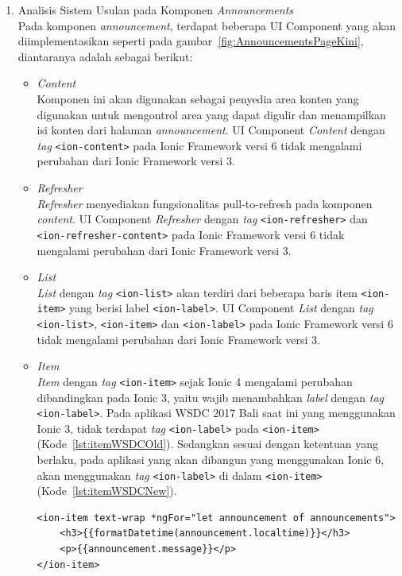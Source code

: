 \begin{enumerate}
\begin{enumerate}
		\item Analisis Sistem Usulan pada Komponen \textit{Announcements} \\
		Pada komponen \textit{announcement}, terdapat beberapa UI Component yang akan diimplementasikan seperti pada gambar~\ref{fig:AnnouncementsPageKini}, diantaranya adalah sebagai berikut:
	\begin{itemize}
		\item \textit{Content} \\
		Komponen ini akan digunakan sebagai penyedia area konten yang digunakan untuk mengontrol area yang dapat digulir dan menampilkan isi konten dari halaman \textit{announcement}. UI Component \textit{Content} dengan \textit{tag} \texttt{<ion-content>} pada Ionic Framework versi 6 tidak mengalami perubahan dari Ionic Framework versi 3. 
		
		\item \textit{Refresher} \\
		\textit{Refresher} menyediakan fungsionalitas  pull-to-refresh pada komponen \textit{content}. UI Component \textit{Refresher} dengan \textit{tag} \texttt{<ion-refresher>} dan \texttt{<ion-refresher-content>} pada Ionic Framework versi 6 tidak mengalami perubahan dari Ionic Framework versi 3.

		\item \textit{List} \\
		\textit{List} dengan \textit{tag} \texttt{<ion-list>} akan terdiri dari beberapa baris item \texttt{<ion-item>} yang berisi label \texttt{<ion-label>}. UI Component \textit{List} dengan \textit{tag} \texttt{<ion-list>}, \texttt{<ion-item>} dan \texttt{<ion-label>} pada Ionic Framework versi 6 tidak mengalami perubahan dari Ionic Framework versi 3.
		
		\item \textit{Item} \\
		\textit{Item} dengan \textit{tag} \texttt{<ion-item>} sejak Ionic 4 mengalami perubahan dibandingkan pada Ionic 3, yaitu wajib menambahkan \textit{label} dengan \textit{tag} \texttt{<ion-label>}. Pada aplikasi WSDC 2017 Bali saat ini yang menggunakan Ionic 3, tidak terdapat \textit{tag} \texttt{<ion-label>} pada \texttt{<ion-item>} (Kode~\ref{lst:itemWSDCOld}). Sedangkan sesuai dengan ketentuan yang berlaku, pada aplikasi yang akan dibangun yang menggunakan Ionic 6, akan menggunakan \textit{tag} \texttt{<ion-label>} di dalam \texttt{<ion-item>} (Kode~\ref{lst:itemWSDCNew}).
		
\begin{lstlisting}[label={lst:itemWSDCOld}, caption=\textit{Tag} \texttt{<ion-item>} dengan Ionic 3 di Aplikasi WSDC 2017 Bali Saat Ini]
<ion-item text-wrap *ngFor="let announcement of announcements">
	<h3>{{formatDatetime(announcement.localtime)}}</h3>
    <p>{{announcement.message}}</p>
</ion-item>
\end{lstlisting}


\end{itemize}
\end{enumerate}
\end{enumerate}
